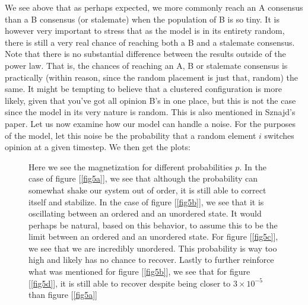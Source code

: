 \documentclass{article}
\begin{document}
We see above that as perhaps expected, we more commonly reach an A consensus than a B consensus (or stalemate) when the population of B is so tiny. It is however very important to stress that as the model is in its entirety random, there is still a very real chance of reaching both a B and a stalemate consensus. \newline
Note that there is no substantial difference between the results outside of the power law. That is, the chances of reaching an A, B or stalemate consensus is practically (within reason, since the random placement is just that, random) the same. It might be tempting to believe that a clustered configuration is more likely, given that you've got all opinion B's in one place, but this is not the case since the model in its very nature is random. This is also mentioned in Sznajd's paper.
\newline
Let us now examine how our model can handle a noise. For the purposes of the model, let this noise be the probability that a random element $i$ switches opinion at a given timestep. \newline We then get the plots:
\begin{figure}[ht!] 
\centering
{}
\newline
{}
\caption{Here we see the magnetization for different probabilities $p$. \newline
In the case of figure [\ref{fig5a}], we see that although the probability can somewhat shake our system out of order, it is still able to correct itself and stabilize.
\newline In the case of figure [\ref{fig5b}], we see that it is oscillating between an ordered and an unordered state. It would perhaps be natural, based on this behavior, to assume this to be the limit between an ordered and an unordered state.
\newline For figure [\ref{fig5c}], we see that we are incredibly unordered. This probability is way too high and likely has no chance to recover.
\newline Lastly to further reinforce what was mentioned for figure [\ref{fig5b}], we see that for figure [\ref{fig5d}], it is still able to recover despite being closer to $3\times 10^{-5}$ than figure [\ref{fig5a}]}
\end{figure} \newpage
\end{document}

